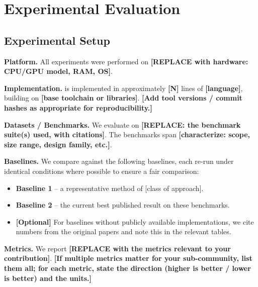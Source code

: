 \section{Experimental Evaluation}
\label{sec:experiments}

\subsection{Experimental Setup}
\label{sec:experiments:setup}


\textbf{Platform.} All experiments were performed on \textbf{[REPLACE
with hardware: CPU/GPU model, RAM, OS]}.

\textbf{Implementation.} \method{} is implemented in approximately
\textbf{[N]} lines of \textbf{[language]}, building on
\textbf{[base toolchain or libraries]}. \textbf{[Add tool versions /
commit hashes as appropriate for reproducibility.]}

\textbf{Datasets / Benchmarks.} We evaluate on \textbf{[REPLACE: the
benchmark suite(s) used, with citations]}. The benchmarks span
\textbf{[characterize: scope, size range, design family, etc.]}.

\textbf{Baselines.} We compare against the following baselines, each
re-run under identical conditions where possible to ensure a fair
comparison:
\begin{itemize}
    \item \textbf{Baseline 1} \cite{PLACEHOLDER_baseline1} -- a
          representative method of [class of approach].
    \item \textbf{Baseline 2} \cite{PLACEHOLDER_baseline2} -- the
          current best published result on these benchmarks.
    \item \textbf{[Optional]} For baselines without publicly available
          implementations, we cite numbers from the original papers and
          note this in the relevant tables.
\end{itemize}

\textbf{Metrics.} We report \textbf{[REPLACE with the metrics relevant
to your contribution]}. \textbf{[If multiple metrics matter for your
sub-community, list them all; for each metric, state the direction
(higher is better / lower is better) and the units.]}

